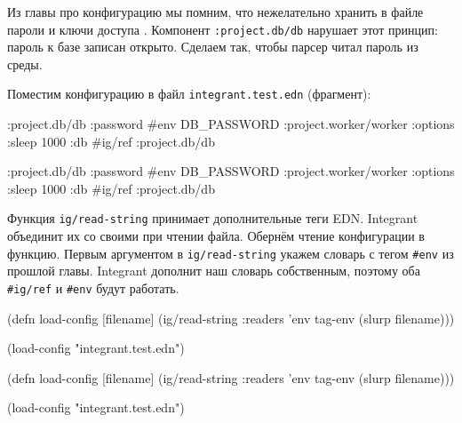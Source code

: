 Из главы про конфигурацию мы помним, что нежелательно хранить в файле пароли и
ключи доступа . Компонент \verb|:project.db/db| нарушает
этот принцип: пароль к базе записан открыто. Сделаем так, чтобы парсер читал
пароль из среды.

Поместим конфигурацию в файл \texttt{integrant\-.test.edn} (фрагмент):

\ifx\DEVICETYPE\MOBILE

\begin{english}
  \begin{clojure}
{:project.db/db
 {:password #env DB_PASSWORD}
 :project.worker/worker
 {:options {:sleep 1000}
  :db #ig/ref :project.db/db}}
  \end{clojure}
\end{english}

\else

\begin{english}
  \begin{clojure}
{:project.db/db {:password #env DB_PASSWORD}
 :project.worker/worker {:options {:sleep 1000}
                         :db #ig/ref :project.db/db}}
  \end{clojure}
\end{english}

\fi

Функция \verb|ig/read-string| принимает дополнительные теги EDN. Integrant
объединит их со своими при чтении файла. Обернём чтение конфигурации в
функцию. Первым аргументом в \verb|ig/read-string| укажем словарь с тегом
\verb|#env| из прошлой главы. Integrant дополнит наш словарь собственным,
поэтому оба \verb|#ig/ref| и \verb|#env| будут работать.

\ifx\DEVICETYPE\MOBILE

\begin{english}
  \begin{clojure}
(defn load-config [filename]
  (ig/read-string
    {:readers {'env tag-env}}
    (slurp filename)))

(load-config "integrant.test.edn")
  \end{clojure}
\end{english}

\else

\begin{english}
  \begin{clojure}
(defn load-config [filename]
  (ig/read-string {:readers {'env tag-env}}
                  (slurp filename)))

(load-config "integrant.test.edn")
  \end{clojure}
\end{english}

